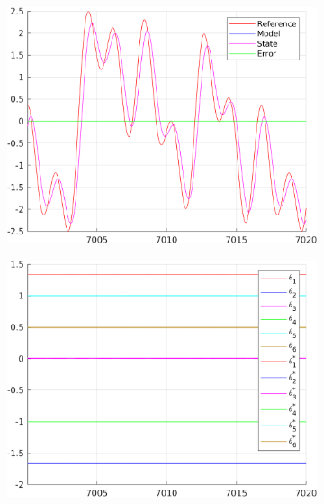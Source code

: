 \documentclass[12pt,a4paper]{article}
\begin{document}
	\begin{figure}[H]
		\centering
		\begin{subfigure}{.45\textwidth}
			\centering
			\includegraphics[width=1\textwidth]{Graphics/NonLinearState4.png}
		\end{subfigure}%
		\begin{subfigure}{.45\textwidth}
			\centering
			\includegraphics[width=1\textwidth]{Graphics/NonLinearParameters4.png}
		\end{subfigure}
		\begin{subfigure}{.45\textwidth}
			\centering

\end{subfigure}
\end{figure}
\end{document}
